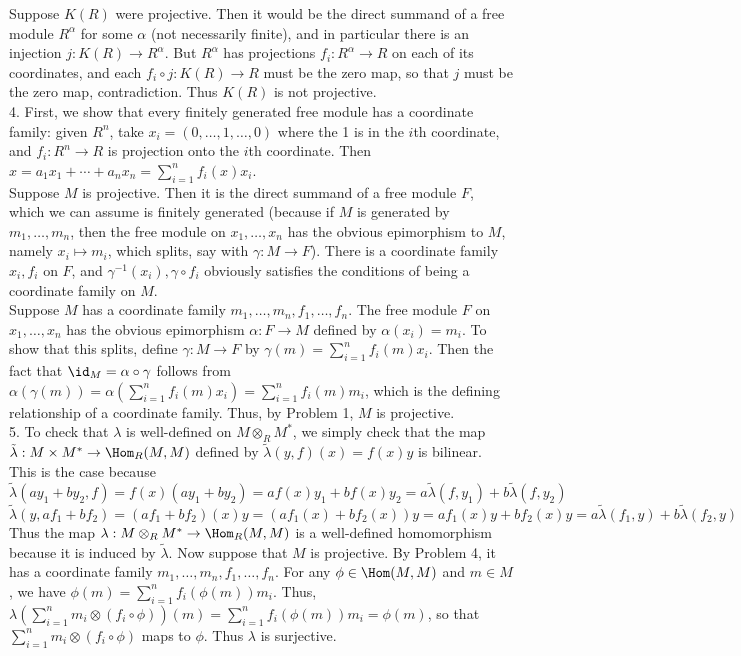 \documentclass[11pt]{article}
\begin{document}
Suppose $K(R)$ were projective. Then it would be the direct summand of a free module $R^\alpha$ for some $\alpha$ (not necessarily finite), and in particular there is an injection $j:K(R)\rightarrow R^\alpha$. But $R^\alpha$ has projections $f_i:R^\alpha\rightarrow R$ on each of its coordinates, and each $f_i\circ j:K(R)\rightarrow R$ must be the zero map, so that $j$ must be the zero map, contradiction. Thus $K(R)$ is not projective.    \\

\num{4.} First, we show that every finitely generated free module has a coordinate family: given $R^n$, take $x_i=(0,\ldots,1,\ldots,0)$ where the 1 is in the $i$th coordinate, and $f_i:R^n\rightarrow R$ is projection onto the $i$th coordinate. Then $x=a_1x_1+\cdots+a_nx_n=\sum_{i=1}^n f_i(x)x_i$.\\

Suppose $M$ is projective. Then it is the direct summand of a free module $F$, which we can assume is finitely generated (because if $M$ is generated by $m_1,\ldots,m_n$, then the free module on $x_1,\ldots,x_n$ has the obvious epimorphism to $M$, namely $x_i\mapsto m_i$, which splits, say with $\gamma:M\rightarrow F$). There is a coordinate family $x_i,f_i$ on $F$, and $\gamma^{-1}(x_i),\gamma\circ f_i$ obviously satisfies the conditions of being a coordinate family on $M$.      \\

Suppose $M$ has a coordinate family $m_1,\ldots,m_n,f_1,\ldots,f_n$. The free module $F$ on $x_1,\ldots,x_n$ has the obvious epimorphism $\alpha:F\rightarrow M$ defined by $\alpha(x_i)=m_i$. To show that this splits, define $\gamma:M\rightarrow F$ by $\gamma(m)=\sum_{i=1}^n f_i(m)x_i$. Then the fact that $\id_M=\alpha\circ\gamma$ follows from $\alpha(\gamma(m))=\alpha(\sum_{i=1}^n f_i(m)x_i)=\sum_{i=1}^n f_i(m)m_i$, which is the defining relationship of a coordinate family. Thus, by Problem 1, $M$ is projective.\\

\num{5.} To check that $\lambda$ is well-defined on $M\otimes_R M^*$, we simply check that the map $\tilde{\lambda}:M\times M^*\rightarrow\Hom_R(M,M)$ defined by $\tilde{\lambda}(y,f)(x)=f(x)y$ is bilinear. This is the case because \[\tilde{\lambda}(ay_1+by_2,f)=f(x)(ay_1+by_2)=af(x)y_1+bf(x)y_2=a\tilde{\lambda}(f,y_1)+b\tilde{\lambda}(f,y_2)\] \[\tilde{\lambda}(y,af_1+bf_2)=(af_1+bf_2)(x)y=(af_1(x)+bf_2(x))y=af_1(x)y+bf_2(x)y=a\tilde{\lambda}(f_1,y)+b\tilde{\lambda}(f_2,y)\]
Thus the map $\lambda:M\otimes_R M^*\rightarrow\Hom_R(M,M)$ is a well-defined homomorphism because it is induced by $\tilde{\lambda}$. Now suppose that $M$ is projective. By Problem 4, it has a coordinate family $m_1,\ldots,m_n,f_1,\ldots,f_n$. For any $\phi\in\Hom(M,M)$ and $m\in M$, we have $\phi(m)=\sum_{i=1}^n f_i(\phi(m))m_i$. Thus, $\lambda(\sum_{i=1}^n m_i\otimes (f_i\circ\phi))(m)=\sum_{i=1}^n f_i(\phi(m))m_i=\phi(m)$, so that $\sum_{i=1}^n m_i\otimes(f_i\circ\phi)$ maps to $\phi$. Thus $\lambda$ is surjective.\\
\end{document}
